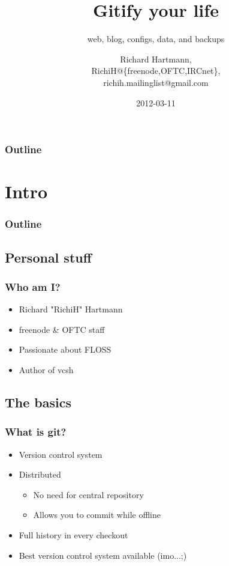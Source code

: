 \documentclass[t]{beamer}
\title{Gitify your life}
\subtitle{web, blog, configs, data, and backups}
\author{Richard Hartmann,\\
RichiH@\{freenode,OFTC,IRCnet\},\\
richih.mailinglist@gmail.com}
\date{2012-03-11}
\begin{document}
\setcounter{tocdepth}{1}

\begin{frame}
	\titlepage
\end{frame}

\begin{frame}
	\frametitle{Outline}
	\tableofcontents
\end{frame}

\section{Intro}

\begin{frame}
	\frametitle{Outline}
	\tableofcontents[currentsection]
\end{frame}

\subsection{Personal stuff}

\begin{frame}
	\frametitle{Who am I?}
	\begin{itemize}
		\item Richard "RichiH" Hartmann
		\item freenode \& OFTC staff
		\item Passionate about FLOSS
		\item Author of vcsh
	\end{itemize}
\end{frame}

\subsection{The basics}

\begin{frame}
	\frametitle{What is git?}
	\begin{itemize}
		\item Version control system
		\item Distributed
		\begin{itemize}
			\item No need for central repository
			\item Allows you to commit while offline
		\end{itemize}
		\item Full history in every checkout
		\item Best version control system available (imo...;)
	\end{itemize}
\end{frame}
\end{document}
